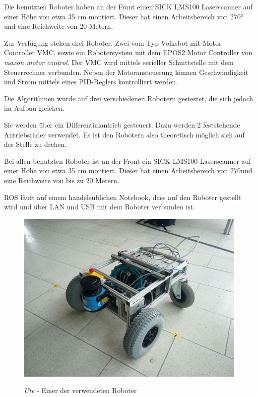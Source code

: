 \documentclass[11pt,a4paper]{article}
\begin{document}
{Die benutzten Roboter haben an der Front einen SICK LMS100 Laserscanner auf einer H\"ohe von etwa 35 cm montiert. Dieser hat einen Arbeitsbereich von 270° und eine Reichweite von 20 Metern. 
 
Zur Verf\"ugung stehen drei Roboter. Zwei vom Typ Volksbot mit Motor Controller VMC, sowie ein Robotersystem mit dem EPOS2 Motor Controller von \textit{maxon motor control}. Der VMC \cite{Volksbot} wird mittels serieller Schnittstelle mit dem Steuerrechner verbunden. Neben der Motoransteuerung können Geschwindigkeit und Strom mittels eines PID-Reglers kontrolliert werden. 
  
Die Algorithmen wurde auf drei verschiedenen Robotern gestestet, die sich jedoch im Aufbau gleichen.
 
Sie werden über ein Differentialantrieb gesteuert. Dazu werden 2 feststehende Antriebsr\"ader verwendet. Es ist den Robotern also theoretisch möglich sich auf der Stelle zu drehen.

Bei allen benutzten Roboter ist an der Front ein SICK LMS100 Laserscanner auf einer H\"ohe von etwa 35 cm montiert. Dieser hat einen Arbeitsbereich von 270\degree  und eine Reichweite von bis zu 20 Metern.\cite{lms} 
 
ROS läuft auf einem handelsüblichen Notebook, dass auf den Roboter gestellt wird und über LAN und USB mit dem Roboter verbunden ist. 
 

\begin{figure}[h]
	\centering
	{\includegraphics[trim= 2cm 2cm 2cm 2cm, clip=true,width=\linewidth]{pictures/robot.jpg}}
	\caption{\textit{Ute} - Einer der verwendeten Roboter}
\end{figure}


}
\end{document}
